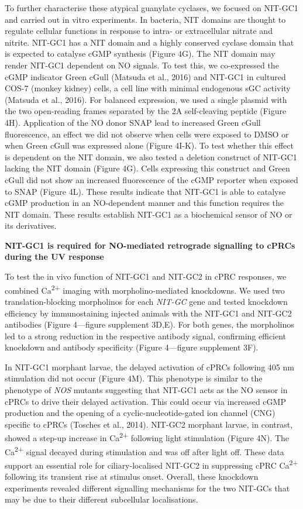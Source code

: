 \documentclass[
  10pt,
  onecolumn]{article}
\begin{document}
To further characterise these atypical guanylate cyclases, we focused on
NIT-GC1 and carried out in vitro experiments. In bacteria, NIT domains
are thought to regulate cellular functions in response to intra- or
extracellular nitrate and nitrite. NIT-GC1 has a NIT domain and a highly
conserved cyclase domain that is expected to catalyse cGMP synthesis
(Figure 4G). The NIT domain may render NIT-GC1 dependent on NO signals.
To test this, we co-expressed the cGMP indicator Green cGull (Matsuda et
al., 2016) and NIT-GC1 in cultured COS-7 (monkey kidney) cells, a cell
line with minimal endogenous sGC activity (Matsuda et al., 2016). For
balanced expression, we used a single plasmid with the two open-reading
frames separated by the 2A self-cleaving peptide (Figure 4H).
Application of the NO donor SNAP lead to increased Green cGull
fluorescence, an effect we did not observe when cells were exposed to
DMSO or when Green cGull was expressed alone (Figure 4I-K). To test
whether this effect is dependent on the NIT domain, we also tested a
deletion construct of NIT-GC1 lacking the NIT domain (Figure 4G). Cells
expressing this construct and Green cGull did not show an increased
fluorescence of the cGMP reporter when exposed to SNAP (Figure 4L).
These results indicate that NIT-GC1 is able to catalyse cGMP production
in an NO-dependent manner and this function requires the NIT domain.
These results establish NIT-GC1 as a biochemical sensor of NO or its
derivatives.

\textbf{NIT-GC1 is required for NO-mediated retrograde signalling to
cPRCs during the UV response}

To test the in vivo function of NIT-GC1 and NIT-GC2 in cPRC responses,
we combined Ca\textsuperscript{2+} imaging with morpholino-mediated
knockdowns. We used two translation-blocking morpholinos for each
\emph{NIT-GC} gene and tested knockdown efficiency by immunostaining
injected animals with the NIT-GC1 and NIT-GC2 antibodies (Figure
4---figure supplement 3D,E). For both genes, the morpholinos led to a
strong reduction in the respective antibody signal, confirming efficient
knockdown and antibody specificity (Figure 4---figure supplement 3F).

In NIT-GC1 morphant larvae, the delayed activation of cPRCs following
405 nm stimulation did not occur (Figure 4M). This phenotype is similar
to the phenotype of \emph{NOS} mutants suggesting that NIT-GC1 acts as
the NO sensor in cPRCs to drive their delayed activation. This could
occur via increased cGMP production and the opening of a
cyclic-nucleotide-gated ion channel (CNG) specific to cPRCs (Tosches et
al., 2014). NIT-GC2 morphant larvae, in contrast, showed a step-up
increase in Ca\textsuperscript{2+} following light stimulation (Figure
4N). The Ca\textsuperscript{2+} signal decayed during stimulation and
was off after light off. These data support an essential role for
ciliary-localised NIT-GC2 in suppressing cPRC Ca\textsuperscript{2+}
following its transient rise at stimulus onset. Overall, these knockdown
experiments revealed different signalling mechanisms for the two NIT-GCs
that may be due to their different subcellular localisations.
\end{document}

